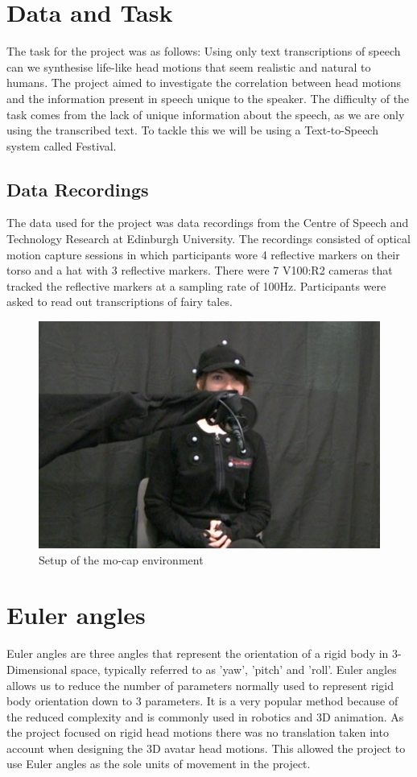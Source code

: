 \documentclass[bsc,frontabs,twoside,singlespacing,parskip]{infthesis}
\begin{document}
\section{Data and Task}

The task for the project was as follows: Using only text transcriptions of speech can we synthesise life-like head motions that seem realistic and natural to humans. The project aimed to investigate the correlation between head motions and the information present in speech unique to the speaker. The difficulty of the task comes from the lack of unique information about the speech, as we are only using the transcribed text. To tackle this we will be using a Text-to-Speech system called Festival.

\subsection{Data Recordings}

The data used for the project was data recordings from the Centre of Speech and Technology Research at Edinburgh University. The recordings consisted of optical motion capture sessions in which participants wore 4 reflective markers on their torso and a hat with 3 reflective markers. There were 7 V100:R2 cameras that tracked the reflective markers at a sampling rate of 100Hz. Participants were asked to read out transcriptions of fairy tales.

\begin{figure}[h!]
	\centering
	\includegraphics[width=.7\textwidth]{mocap.png}
	\caption{Setup of the mo-cap environment}
\end{figure}

\section{Euler angles}

Euler angles are three angles that represent the orientation of a rigid body in 3-Dimensional space, typically referred to as 'yaw', 'pitch' and 'roll'. Euler angles allows us to reduce the number of parameters normally used to represent rigid body orientation down to 3 parameters. It is a very popular method because of the reduced complexity and is commonly used in robotics and 3D animation. As the project focused on rigid head motions there was no translation taken into account when designing the 3D avatar head motions. This allowed the project to use Euler angles as the sole units of movement in the project.
\end{document}
